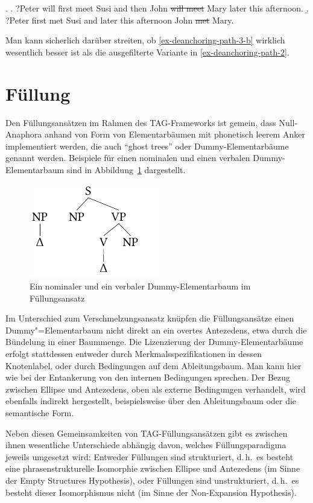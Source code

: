 \ex.
\a. ?Peter will first meet Susi and then John \sout{will meet} Mary later this afternoon.\label{ex-deanchoring-path-3-a}
\b. ?Peter first met Susi and later this afternoon John \sout{met} Mary.\label{ex-deanchoring-path-3-b} 

Man kann sicherlich darüber streiten, ob \ref{ex-deanchoring-path-3-b} wirklich wesentlich besser ist als die ausgefilterte Variante in \ref{ex-deanchoring-path-2}.
   


\section{Füllung} \label{sec-fuellung}

Den Füllungsansätzen im Rahmen des TAG-Frameworks ist gemein, dass Null-Anaphora anhand von Form von Elementarbäumen mit phonetisch leerem Anker implementiert werden, die auch "`ghost trees"' \citep{Seddah:Sagot:06} oder Dummy-Elementarbäume genannt werden. Beispiele für einen nominalen und einen verbalen Dummy-Elementarbaum sind in Abbildung~\ref{fig-tag-fuellung-1} dargestellt.
\begin{figure}[t]
\centering
\includegraphics[angle=90]{graphics/abb824.pdf}
\caption{\label{fig-tag-fuellung-1}Ein nominaler und ein verbaler Dummy-Elementarbaum im Füllungsansatz}
\end{figure}  
Im Unterschied zum Verschmelzungsansatz knüpfen die Füllungsansätze einen Dummy"=Elementarbaum nicht direkt an ein overtes Antezedens, etwa durch die Bündelung in einer Baummenge. Die Lizenzierung der Dummy-Elementarbäume erfolgt stattdessen entweder durch Merkmalsspezifikationen in dessen Knotenlabel, oder durch Bedingungen auf dem Ableitungsbaum. Man kann hier wie bei der Entankerung von den internen Bedingungen sprechen. Der Bezug zwischen Ellipse und Antezedens, oben als externe Bedingungen verhandelt, wird ebenfalls indirekt hergestellt, beispielsweise über den Ableitungsbaum oder die semantische Form.

Neben diesen Gemeinsamkeiten von TAG-Füllungsansätzen gibt es zwischen ihnen wesentliche Unterschiede abhängig davon, welches Füllungsparadigma jeweils umgesetzt wird: Entweder Füllungen sind strukturiert, d.\,h.\ es besteht eine phrasenstrukturelle Isomorphie zwischen Ellipse und Antezedens (im Sinne der Empty Structures Hypothesis), oder Füllungen sind unstrukturiert, d.\,h.\ es besteht dieser Isomorphismus nicht (im Sinne der Non-Expansion Hypothesis).  




